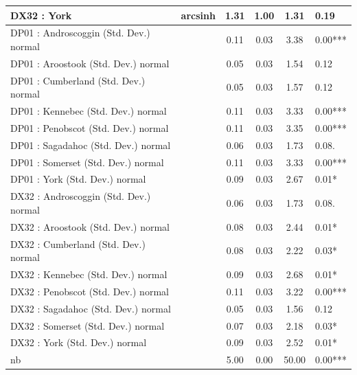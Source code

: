 \begin{table}
\begin{center}
\begin{tabular}{|l|l|c|c|c|l|}
			\hline
			DX32 : York & arcsinh & 1.31 & 1.00 & 1.31 & 0.19 \\
			\hline
			DP01 : Androscoggin (Std. Dev.) normal &  & 0.11 & 0.03 & 3.38 & 0.00*** \\
			\hline
			DP01 : Aroostook (Std. Dev.) normal &  & 0.05 & 0.03 & 1.54 & 0.12 \\
			\hline
			DP01 : Cumberland (Std. Dev.) normal &  & 0.05 & 0.03 & 1.57 & 0.12 \\
			\hline
			DP01 : Kennebec (Std. Dev.) normal &  & 0.11 & 0.03 & 3.33 & 0.00*** \\
			\hline
			DP01 : Penobscot (Std. Dev.) normal &  & 0.11 & 0.03 & 3.35 & 0.00*** \\
			\hline
			DP01 : Sagadahoc (Std. Dev.) normal &  & 0.06 & 0.03 & 1.73 & 0.08. \\
			\hline
			DP01 : Somerset (Std. Dev.) normal &  & 0.11 & 0.03 & 3.33 & 0.00*** \\
			\hline
			DP01 : York (Std. Dev.) normal &  & 0.09 & 0.03 & 2.67 & 0.01* \\
			\hline
			DX32 : Androscoggin (Std. Dev.) normal &  & 0.06 & 0.03 & 1.73 & 0.08. \\
			\hline
			DX32 : Aroostook (Std. Dev.) normal &  & 0.08 & 0.03 & 2.44 & 0.01* \\
			\hline
			DX32 : Cumberland (Std. Dev.) normal &  & 0.08 & 0.03 & 2.22 & 0.03* \\
			\hline
			DX32 : Kennebec (Std. Dev.) normal &  & 0.09 & 0.03 & 2.68 & 0.01* \\
			\hline
			DX32 : Penobscot (Std. Dev.) normal &  & 0.11 & 0.03 & 3.22 & 0.00*** \\
			\hline
			DX32 : Sagadahoc (Std. Dev.) normal &  & 0.05 & 0.03 & 1.56 & 0.12 \\
			\hline
			DX32 : Somerset (Std. Dev.) normal &  & 0.07 & 0.03 & 2.18 & 0.03* \\
			\hline
			DX32 : York (Std. Dev.) normal &  & 0.09 & 0.03 & 2.52 & 0.01* \\
			\hline
			nb &  & 5.00 & 0.00 & 50.00 & 0.00*** \\
			\hline
		\end{tabular}
	\end{center}
\end{table}